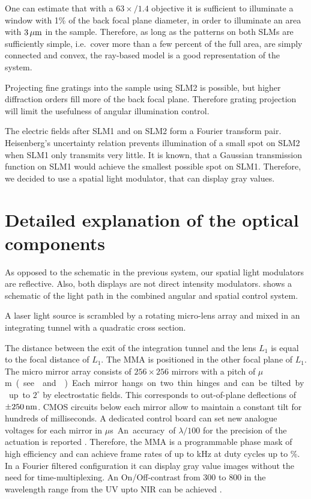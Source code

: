 One can estimate that with a $63\!\!\times\!\!/1.4$ objective it is
sufficient to illuminate a window with 1\% of the back focal plane
diameter, in order to illuminate an area with $\unit[3]{\mu m}$ in the
sample.  Therefore, as long as the patterns on both SLMs are
sufficiently simple, i.e.\ cover more than a few percent of the full
area, are simply connected and convex, %
the ray-based model is a good representation of the system.

Projecting fine gratings into the sample using SLM2 is possible, but
higher diffraction orders fill more of the back focal plane. Therefore
grating projection will limit the usefulness of angular illumination
control.

The electric fields after SLM1 and on SLM2 form a Fourier transform
pair. Heisenberg's uncertainty relation prevents illumination of a
small spot on SLM2 when SLM1 only transmits very little. It is known,
that a Gaussian transmission function on SLM1 would achieve the
smallest possible spot on SLM1. Therefore, we decided to use a spatial
light modulator, that can display gray values.

\section{Detailed explanation of the optical components}

As opposed to the schematic in the previous system, our spatial light
modulators are reflective.  Also, both displays are not direct
intensity modulators.   shows a schematic of the
light path in the combined angular and spatial control system.

A laser light source is scrambled by a rotating micro-lens array and
mixed in an integrating tunnel with a quadratic cross section.

The distance between the exit of the integration tunnel and the lens
$L_1$ is equal to the focal distance of $L_1$. The MMA is positioned
in the other focal plane of $L_1$. The micro mirror array
\citep{Berndt2007,Schmidt2010,Berndt2010} consists of $256\times 256$
mirrors with a pitch of \unit[16]{$\mu$m} (see  and
). Each mirror hangs on two thin hinges and
can be tilted by up to $2^\circ$ by electrostatic fields. This
corresponds to out-of-plane deflections of $\pm\unit[250]{nm}$.  CMOS
circuits below each mirror allow to maintain a constant tilt for
hundreds of milliseconds. A dedicated control board can set new
analogue voltages for each mirror in \unit[850]{$\mu$s}. An accuracy
of $\lambda/100$ for the precision of the actuation is reported
\citep{Berndt2011}. Therefore, the MMA is a programmable phase mask of
high efficiency and can achieve frame rates of up to \unit[1]{kHz} at
duty cycles up to \unit[50]{\%}. In a Fourier filtered configuration
it can display gray value images without the need for
time-multiplexing.  An On/Off-contrast from 300 to 800 in the
wavelength range from the UV upto NIR can be achieved
\citep{Berndt2011}.

